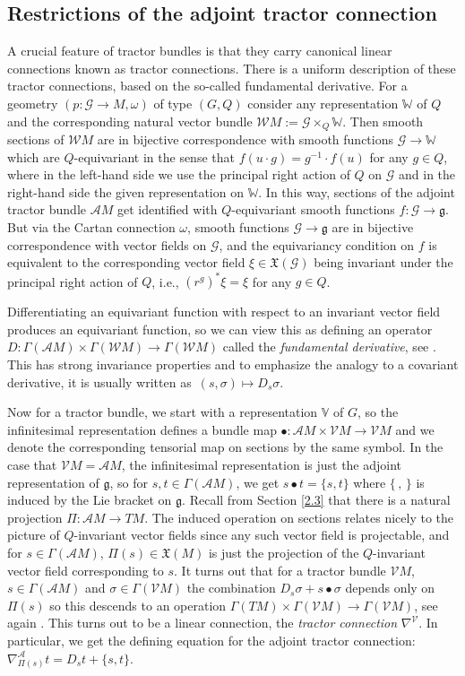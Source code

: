 \documentclass[10pt,a4paper]{amsart}
\numberwithin{equation}{section}
\def\frak{\mathfrak}
\def\Bbb{\mathbb}
\def\Cal{\mathcal}
\newcommand{\x}{\times}
\newcommand{\om}{\omega}
\newcommand{\si}{\sigma}
\newcommand{\Ga}{\Gamma}
\begin{document}
\subsection{Restrictions of the adjoint tractor connection}\label{3.1}
A crucial feature of tractor bundles is that they carry canonical linear connections
known as tractor connections. There is a uniform description of these tractor
connections, based on the so-called fundamental derivative. For a geometry $(p\colon \Cal
G\to M,\om)$ of type $(G,Q)$ consider any representation $\Bbb W$ of $Q$ and the
corresponding natural vector bundle $\Cal WM:=\Cal G\x_Q\Bbb W$. Then smooth sections
of $\Cal WM$ are in bijective correspondence with smooth functions $\Cal G\to\Bbb W$
which are $Q$-equivariant in the sense that $f(u\cdot g)=g^{-1}\cdot f(u)$ for any
$g\in Q$, where in the left-hand side we use the principal right action of $Q$ on
$\Cal G$ and in the right-hand side the given representation on $\mathbb{W}$. In this way,
sections of the adjoint tractor bundle $\Cal AM$ get identified with $Q$-equivariant
smooth functions $f\colon \Cal G\to\frak g$. But via the Cartan connection $\om$, smooth
functions $\Cal G\to\frak g$ are in bijective correspondence with vector fields on
$\Cal G$, and the equivariancy condition on $f$ is equivalent to the corresponding
vector field $\xi\in\frak X(\Cal G)$ being invariant under the principal right action
of $Q$, i.e., $(r^g)^*\xi=\xi$ for any $g\in Q$.

Differentiating an equivariant function with respect to an invariant vector field
produces an equivariant function, so we can view this as defining an operator
$D\colon \Gamma(\Cal AM)\x \Ga(\Cal WM)\to\Ga(\Cal WM)$ called the \textit{fundamental
 derivative}, see \cite[Section 1.5.8]{book}. This has strong invariance
properties and to emphasize the analogy to a covariant derivative, it is usually
written as~${(s,\si)\!\mapsto\! D_s\si}$.

Now for a tractor bundle, we start with a representation $\Bbb V$ of $G$, so the
infinitesimal representation defines a bundle map $\bullet\colon \Cal AM\x\Cal VM\to\Cal
VM$ and we denote the corresponding tensorial map on sections by the same symbol. In
the case that $\Cal VM=\Cal AM$, the infinitesimal representation is just the adjoint
representation of $\frak g$, so for $s,t\in\Ga(\Cal AM)$, we get $s\bullet t=\{s,t\}$
where $\{\, ,\, \}$ is induced by the Lie bracket on $\frak g$. Recall from Section
\ref{2.3} that there is a natural projection $\Pi\colon \Cal AM\to TM$. The induced
operation on sections relates nicely to the picture of $Q$-invariant vector fields
since any such vector field is projectable, and for $s\in\Ga(\Cal AM)$,
$\Pi(s)\in\frak X(M)$ is just the projection of the $Q$-invariant vector field
corresponding to $s$. It turns out that for a tractor bundle $\Cal VM$, $s\in\Ga(\Cal
AM)$ and $\si\in\Ga(\Cal VM)$ the combination $D_s\si+s\bullet\si$ depends only on
$\Pi(s)$ so this descends to an operation $\Ga(TM)\x\Ga(\Cal VM)\to\Ga(\Cal VM)$, see
again \cite[Section 1.5.8]{book}. This turns out to be a linear connection, the
\textit{tractor connection} $\nabla^{\Cal V}$. In particular, we get the defining
equation for the adjoint tractor connection: $\nabla^{\Cal
 A}_{\Pi(s)}t=D_st+\{s,t\}$.
\end{document}
